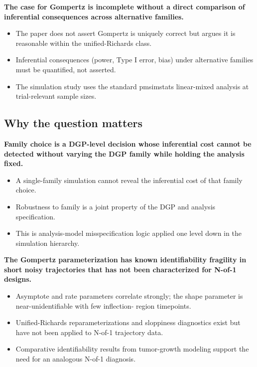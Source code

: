 \documentclass[
  11pt,
]{article}
\begin{document}
\textbf{The case for Gompertz is incomplete without a direct
comparison of inferential consequences across alternative
families.}

\begin{itemize}\setlength{\itemsep}{2pt}\setlength{\parskip}{0pt}
\item The paper does not assert Gompertz is uniquely correct
  but argues it is reasonable within the unified-Richards class.
\item Inferential consequences (power, Type I error, bias)
  under alternative families must be quantified, not asserted.
\item The simulation study uses the standard pmsimstats
  linear-mixed analysis at trial-relevant sample sizes.
\end{itemize}

\subsection{Why the question matters}\label{why-the-question-matters}

\textbf{Family choice is a DGP-level decision whose inferential
cost cannot be detected without varying the DGP family while
holding the analysis fixed.}

\begin{itemize}\setlength{\itemsep}{2pt}\setlength{\parskip}{0pt}
\item A single-family simulation cannot reveal the inferential
  cost of that family choice.
\item Robustness to family is a joint property of the DGP and
  analysis specification.
\item This is analysis-model misspecification logic applied one
  level down in the simulation hierarchy.
\end{itemize}

\textbf{The Gompertz parameterization has known identifiability
fragility in short noisy trajectories that has not been
characterized for N-of-1 designs.}

\begin{itemize}\setlength{\itemsep}{2pt}\setlength{\parskip}{0pt}
\item Asymptote and rate parameters correlate strongly; the
  shape parameter is near-unidentifiable with few inflection-
  region timepoints.
\item Unified-Richards reparameterizations and sloppiness
  diagnostics exist but have not been applied to N-of-1
  trajectory data.
\item Comparative identifiability results from tumor-growth
  modeling support the need for an analogous N-of-1 diagnosis.
\end{itemize}
\end{document}
